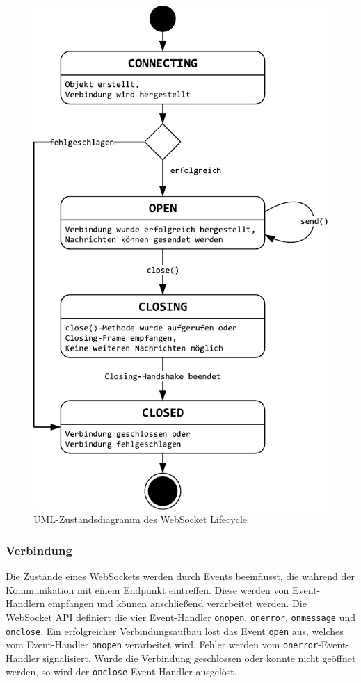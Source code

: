 \documentclass[11pt,a4paper,titlepage]{scrartcl}
\numberwithin{equation}{section}
\begin{document}
\begin{figure}[ht] 
	\begin{center}
		\includegraphics[scale=0.75]{img/wslifecycle.pdf}
		\caption{UML-Zustandsdiagramm des WebSocket Lifecycle}
		\label{fig:wsAPIZustand}
	\end{center}
\end{figure}

\subsubsection{Verbindung}
Die Zustände eines WebSockets werden durch Events beeinflusst, die während der Kommunikation mit einem Endpunkt eintreffen. Diese werden von Event-Handlern empfangen und können anschließend verarbeitet werden. Die WebSocket API definiert die vier Event-Handler \texttt{onopen}, \texttt{onerror}, \texttt{onmessage} und \texttt{onclose}. Ein erfolgreicher Verbindungsaufbau löst das Event \texttt{open} aus, welches vom Event-Handler \texttt{onopen} verarbeitet wird. Fehler werden vom \texttt{onerror}-Event-Handler signalisiert. Wurde die Verbindung geschlossen oder konnte nicht geöffnet werden, so wird der \texttt{onclose}-Event-Handler ausgelöst. \\
\end{document}
